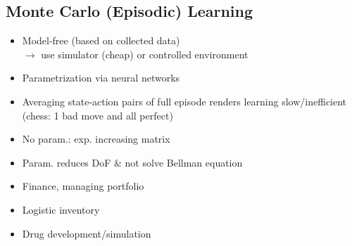 \begin{mdframed}[backgroundcolor=red!20, frametitlerulewidth=0pt, innertopmargin=-2mm, innerbottommargin=2mm, skipabove=0mm]
\section{Monte Carlo (Episodic) Learning}
\end{mdframed}
\begin{minipage}{0.33\textwidth}
    \begin{tcolorbox}[colframe=green!50!black, colback=green!5!white, title=Pros, left=0.5mm, right=0.5mm]
    \begin{itemize}[leftmargin=*]
        \item Model-free (based on collected data) \\
        $\rightarrow$ use simulator (cheap) or controlled environment
        \item Parametrization via neural networks
    \end{itemize}
    \end{tcolorbox}
\end{minipage}
\begin{minipage}{0.33\textwidth}
    \begin{tcolorbox}[colframe=red!50!black, colback=red!5!white, title=Cons, left=0.5mm, right=0.5mm]
    \begin{itemize}[leftmargin=*]
        \item Averaging state-action pairs of full episode renders learning slow/inefficient (chess: 1 bad move and all perfect)
        \item No param.: exp. increasing matrix
        \item Param. reduces DoF \& not solve Bellman equation
    \end{itemize}
    \end{tcolorbox}
\end{minipage}
\begin{minipage}{0.33\textwidth}
    \begin{tcolorbox}[colframe=gray!50!black, colback=gray!5!white, title=Examples, left=0.5mm, right=0.5mm]
    \begin{itemize}[leftmargin=*]
        \item Finance, managing portfolio
        \item Logistic inventory
        \item Drug development/simulation
    \end{itemize}
    \end{tcolorbox}
\end{minipage}\\ \\
